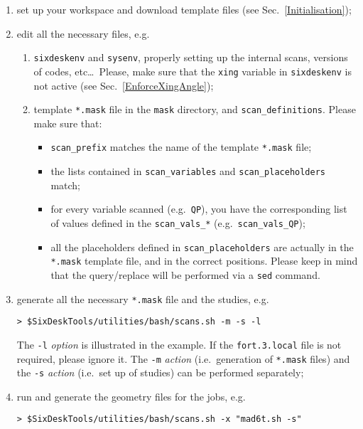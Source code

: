 \begin{enumerate}
\item set up your workspace and download template files
  (see Sec.~\ref{Initialisation});
\item edit all the necessary files, e.g.
  \begin{enumerate}
  \item \texttt{sixdeskenv} and \texttt{sysenv}, properly setting up
    the internal scans, versions of codes, etc\ldots~Please, make sure
    that the \texttt{xing} variable in \texttt{sixdeskenv} is not
    active (see Sec.~\ref{EnforceXingAngle});
  \item template \texttt{*.mask} file in the \texttt{mask} directory,
    and \texttt{scan\_definitions}. Please make sure that:
    \begin{itemize}
    \item \texttt{scan\_prefix} matches the name of the template
      \texttt{*.mask} file;
    \item the lists contained in \texttt{scan\_variables} and
      \texttt{scan\_placeholders} match;
    \item for every variable scanned (e.g.~\texttt{QP}), you have the
      corresponding list of values defined in the \texttt{scan\_vals\_*}
      (e.g.~\texttt{scan\_vals\_QP});
    \item all the placeholders defined in \texttt{scan\_placeholders}
      are actually in the \texttt{*.mask} template file, and in the
      correct positions. Please keep in mind that the query/replace
      will be performed via a \texttt{sed} command.
    \end{itemize}
  \end{enumerate}
\item generate all the necessary \texttt{*.mask} file and the
  studies, e.g.
\begin{lstlisting}
> $SixDeskTools/utilities/bash/scans.sh -m -s -l
\end{lstlisting}
The \texttt{-l} \emph{option} is illustrated in the example.
If the \texttt{fort.3.local} file is not required, please ignore it.
The \texttt{-m} \emph{action} (i.e.~generation of \texttt{*.mask} files)
and the \texttt{-s} \emph{action} (i.e.~set up of studies) can be
performed separately;
\item run \MADX{} and generate the geometry files for the \SIXTRACK{}
  jobs, e.g.
\begin{lstlisting}
> $SixDeskTools/utilities/bash/scans.sh -x "mad6t.sh -s"
\end{lstlisting}

\end{enumerate}
